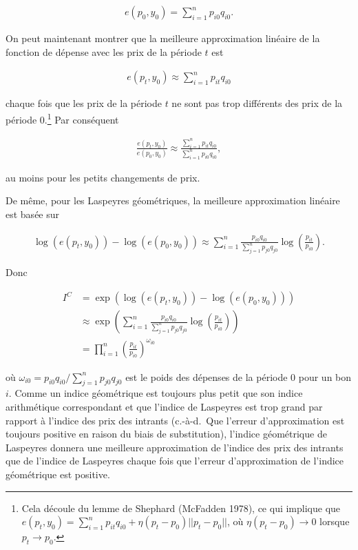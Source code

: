\documentclass[]{article}
\begin{document}
\begin{align*}
e(p_{0}, y_{0}) = \sum_{i = 1}^{n} p_{i0} q_{i0}.
\end{align*}

On peut maintenant montrer que la meilleure approximation linéaire de la fonction de dépense avec les prix de la période \(t\) est

\begin{align*}
e(p_{t}, y_{0}) \approx \sum_{i = 1}^{n} p_{it} q_{i0}
\end{align*}

chaque fois que les prix de la période \(t\) ne sont pas trop différents des prix de la période 0.\footnote{Cela découle du lemme de Shephard (McFadden 1978), ce qui implique que \(e(p_{t}, y_{0}) = \sum_{i = 1}^{n} p_{it} q_{i0} + \eta (p_{t} - p_{0}) || p_{t} - p_{0} ||\), où \(\eta(p_{t} - p_{0}) \rightarrow 0\) lorsque \(p_{t} \rightarrow p_{0}\).} Par conséquent

\begin{align*}
\frac{e(p_{t}, y_{0})}{e(p_{0}, y_{0})} \approx \frac{\sum_{i = 1}^{n} p_{it} q_{i0}} {\sum_{i = 1}^{n} p_{i0} q_{i0}},
\end{align*}

au moins pour les petits changements de prix.

De même, pour les Laspeyres géométriques, la meilleure approximation linéaire est basée sur

\begin{align*}
\log(e(p_{t}, y_{0})) - \log(e(p_{0}, y_{0})) \approx \sum_{i = 1}^{n} \frac{p_{i0} q_{i0}}{\sum_{j = 1}^{n} p_{j0} q_{j0}} \log \left(\frac{p_{it}}{p_{i0}} \right ).
\end{align*}

Donc

\begin{align*}
I^{C} &= \exp(\log(e (p_{t}, y_{0})) - \log(e (p_{0}, y_{0}))) \\
&\approx \exp\left(\sum_{i = 1}^{n} \frac{p_{i0} q_{i0}}{\sum_{j = 1}^{n} p_{j0} q_{j0 }} \log\left(\frac{p_{it}}{p_{i0}} \right) \right) \\
&= \prod_{i = 1}^{n} \left(\frac{p_{it}}{p_{i0}} \right)^{\omega_{i0}}
\end{align*}

où \(\omega_{i0} = p_{i0} q_{i0} / \sum_{j = 1}^{n} p_{j0} q_{j0}\) est le poids des dépenses de la période 0 pour un bon \(i\). Comme un indice géométrique est toujours plus petit que son indice arithmétique correspondant et que l'indice de Laspeyres est trop grand par rapport à l'indice des prix des intrants (c.-à-d.~Que l'erreur d'approximation est toujours positive en raison du biais de substitution), l'indice géométrique de Laspeyres donnera une meilleure approximation de l'indice des prix des intrants que de l'indice de Laspeyres chaque fois que l'erreur d'approximation de l'indice géométrique est positive.
\end{document}
